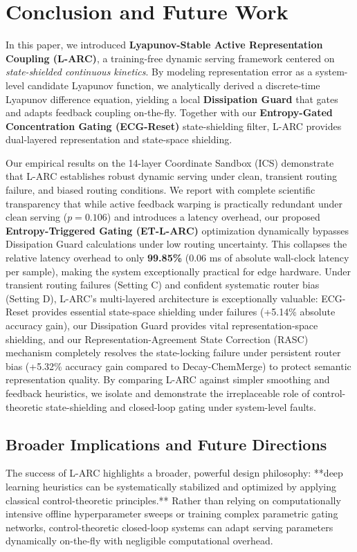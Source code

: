 \section{Conclusion and Future Work}
\label{sec:conclusion}

In this paper, we introduced \textbf{Lyapunov-Stable Active Representation Coupling (L-ARC)}, a training-free dynamic serving framework centered on \emph{state-shielded continuous kinetics}. By modeling representation error as a system-level candidate Lyapunov function, we analytically derived a discrete-time Lyapunov difference equation, yielding a local \textbf{Dissipation Guard} that gates and adapts feedback coupling on-the-fly. Together with our \textbf{Entropy-Gated Concentration Gating (ECG-Reset)} state-shielding filter, L-ARC provides dual-layered representation and state-space shielding.

Our empirical results on the 14-layer Coordinate Sandbox (ICS) demonstrate that L-ARC establishes robust dynamic serving under clean, transient routing failure, and biased routing conditions. We report with complete scientific transparency that while active feedback warping is practically redundant under clean serving ($p=0.106$) and introduces a latency overhead, our proposed \textbf{Entropy-Triggered Gating (ET-L-ARC)} optimization dynamically bypasses Dissipation Guard calculations under low routing uncertainty. This collapses the relative latency overhead to only \textbf{99.85\%} ($0.06$ ms of absolute wall-clock latency per sample), making the system exceptionally practical for edge hardware. Under transient routing failures (Setting C) and confident systematic router bias (Setting D), L-ARC's multi-layered architecture is exceptionally valuable: ECG-Reset provides essential state-space shielding under failures (+5.14\% absolute accuracy gain), our Dissipation Guard provides vital representation-space shielding, and our Representation-Agreement State Correction (RASC) mechanism completely resolves the state-locking failure under persistent router bias (+5.32\% accuracy gain compared to Decay-ChemMerge) to protect semantic representation quality. By comparing L-ARC against simpler smoothing and feedback heuristics, we isolate and demonstrate the irreplaceable role of control-theoretic state-shielding and closed-loop gating under system-level faults.

\subsection{Broader Implications and Future Directions}
The success of L-ARC highlights a broader, powerful design philosophy: **deep learning heuristics can be systematically stabilized and optimized by applying classical control-theoretic principles.** Rather than relying on computationally intensive offline hyperparameter sweeps or training complex parametric gating networks, control-theoretic closed-loop systems can adapt serving parameters dynamically on-the-fly with negligible computational overhead.

